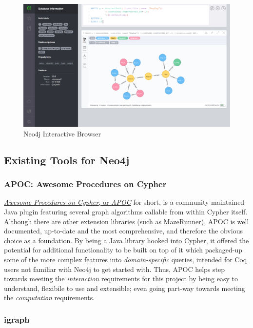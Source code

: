 \begin{figure}[tbp]

\includegraphics[width=\textwidth]{img/Neo4j_Browser.png}
\caption{Neo4j Interactive Browser}
\label{fig:neo4jbrowser}

\end{figure}

\subsection{Existing Tools for Neo4j}

\subsubsection{APOC: Awesome Procedures on Cypher}

\href{http://github.com/neo4j-contrib/neo4j-apoc-procedures}{\emph{Awesome
Procedures on Cypher}, or \emph{APOC}} for short, is a community-maintained Java
plugin featuring several graph algorithms callable from within Cypher itself.
Although there are other extension libraries (such as MazeRunner), APOC is well
documented, up-to-date and the most comprehensive, and therefore the obvious
choice as a foundation. By being a Java library hooked into Cypher, it offered
the potential for additional functionality to be built on top of it which
packaged-up some of the more complex features into \emph{domain-specific}
queries, intended for Coq users not familiar with Neo4j to get started with.
Thus, APOC helps step towards meeting the \emph{interaction} requirements for
this project by being easy to understand, flexibile to use and extensible; even
going part-way towards meeting the \emph{computation} requirements.

\subsubsection{igraph}

